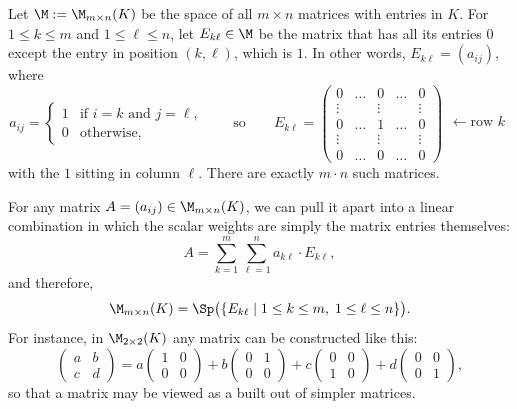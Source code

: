 \begin{example}
\label{ex:span_matrix_space}
Let $\M := \M_{m \times n}(K)$ be the space of all $m \times n$ matrices with entries in $K$. For $1 \le k \le m$ and $1 \le \ell \le n$, let $E_{k\ell} \in \M$ be the matrix that has all its entries $0$ except the entry in position $(k, \ell)$, which is $1$. In other words, $E_{k\ell} = (a_{ij})$, where
\[
a_{ij} =
\begin{cases}
1 & \text{if } i = k \text{ and } j = \ell, \\
0 & \text{otherwise,}
\end{cases}
\qquad \text{so} \qquad
E_{k\ell} =
\begin{pmatrix}
0 & \dots & 0 & \dots & 0 \\
\vdots & & \vdots & & \vdots \\
0 & \dots & 1 & \dots & 0 \\
\vdots & & \vdots & & \vdots \\
0 & \dots & 0 & \dots & 0
\end{pmatrix}
\begin{matrix} \\ \\ \leftarrow \text{row } k \\ \\ \\ \end{matrix}
\]
with the $1$ sitting in column $\ell$. There are exactly $m \cdot n$ such matrices.

For any matrix $A = (a_{ij}) \in \M_{m \times n}(K)$, we can pull it apart into a linear combination in which the scalar weights are simply the matrix entries themselves:
\[
A = \sum_{k=1}^m \sum_{\ell=1}^n a_{k\ell} \cdot E_{k\ell},
\]
and therefore,
\[
\M_{m \times n}(K) = \Sp\bigl(\{E_{k\ell} \mid 1 \le k \le m, \; 1 \le \ell \le n\}\bigr).
\]
For instance, in $\M_{2 \times 2}(K)$ any matrix can be constructed like this:
\[
\begin{pmatrix} a & b \\ c & d \end{pmatrix} = a \begin{pmatrix} 1 & 0 \\ 0 & 0 \end{pmatrix} + b \begin{pmatrix} 0 & 1 \\ 0 & 0 \end{pmatrix} + c \begin{pmatrix} 0 & 0 \\ 1 & 0 \end{pmatrix} + d \begin{pmatrix} 0 & 0 \\ 0 & 1 \end{pmatrix},
\]
so that a matrix may be viewed as a  built out of simpler matrices.
\end{example}

